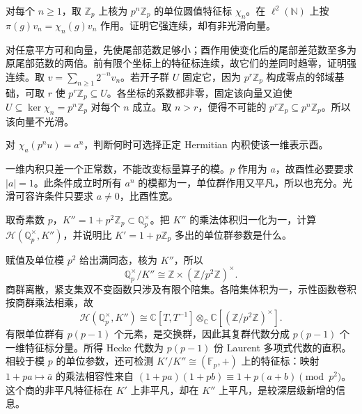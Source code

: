 \begin{exercise}\label{b5:ex:C-continuous-not-smooth}
	对每个 \(n\ge1\)，取 \(\mathbb Z_p\) 上核为 \(p^n\mathbb Z_p\) 的单位圆值特征标 \(\chi_n\)。在 \(\ell^2(\mathbb N)\) 上按 \(\pi(g)v_n=\chi_n(g)v_n\) 作用。证明它强连续，却有非光滑向量。
\end{exercise}
\begin{solution}
	对任意平方可和向量，先使尾部范数足够小；酉作用使变化后的尾部差范数至多为原尾部范数的两倍。前有限个坐标上的特征标连续，故它们的差同时趋零，证明强连续。取 \(v=\sum_{n\ge1}2^{-n}v_n\)。若开子群 \(U\) 固定它，因为 \(p^r\mathbb Z_p\) 构成零点的邻域基础，可取 \(r\) 使 \(p^r\mathbb Z_p\subseteq U\)。各坐标的系数都非零，固定该向量又迫使 \(U\subseteq\ker\chi_n=p^n\mathbb Z_p\) 对每个 \(n\) 成立。取 \(n>r\)，便得不可能的 \(p^r\mathbb Z_p\subseteq p^n\mathbb Z_p\)。所以该向量不光滑。
\end{solution}

\begin{exercise}\label{b5:ex:C-nonarchimedean-character}
	对 \(\chi_a(p^nu)=a^n\)，判断何时可选择正定 Hermitian 内积使该一维表示酉。
\end{exercise}
\begin{solution}
	一维内积只差一个正常数，不能改变标量算子的模。\(p\) 作用为 \(a\)，故酉性必要要求 \(|a|=1\)。此条件成立时所有 \(a^n\) 的模都为一，单位群作用又平凡，所以也充分。光滑可容许条件只要求 \(a\ne0\)，比酉性宽。
\end{solution}

\begin{exercise}\label{b5:ex:C-smaller-level-hecke}
	取奇素数 \(p\)，\(K''=1+p^2\mathbb Z_p\subset\mathbb Q_p^\times\)。把 \(K''\) 的乘法体积归一化为一，计算 \(\mathcal H(\mathbb Q_p^\times,K'')\)，并说明比 \(K'=1+p\mathbb Z_p\) 多出的单位群参数是什么。
\end{exercise}
\begin{solution}
	赋值及单位模 \(p^2\) 给出满同态，核为 \(K''\)，所以
	\[
		\mathbb Q_p^\times/K'' \cong\mathbb Z\times(\mathbb Z/p^2\mathbb Z)^\times.
	\]
	商群离散，紧支集双不变函数只涉及有限个陪集。各陪集体积为一，示性函数卷积按商群乘法相乘，故
	\[
		\mathcal H(\mathbb Q_p^\times,K'') \cong\mathbb C[T,T^{-1}]\otimes_{\mathbb C} \mathbb C[(\mathbb Z/p^2\mathbb Z)^\times].
	\]
	有限单位群有 \(p(p-1)\) 个元素，是交换群，因此其复群代数分成 \(p(p-1)\) 个一维特征标分量。所得 Hecke 代数为 \(p(p-1)\) 份 Laurent 多项式代数的直积。相较于模 \(p\) 的单位参数，还可检测 \(K'/K''\cong(\mathbb F_p,+)\) 上的特征标：映射 \(1+pa\mapsto\bar a\) 的乘法相容性来自 \((1+pa)(1+pb)\equiv1+p(a+b)\pmod{p^2}\)。这个商的非平凡特征标在 \(K'\) 上非平凡，却在 \(K''\) 上平凡，是较深层级新增的信息。
\end{solution}


